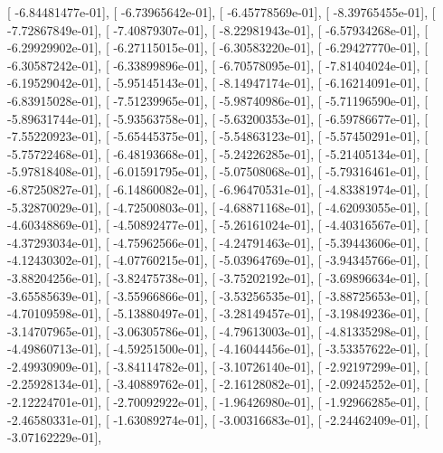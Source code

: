 \documentclass{article}
\begin{document}
       [ -6.84481477e-01],
       [ -6.73965642e-01],
       [ -6.45778569e-01],
       [ -8.39765455e-01],
       [ -7.72867849e-01],
       [ -7.40879307e-01],
       [ -8.22981943e-01],
       [ -6.57934268e-01],
       [ -6.29929902e-01],
       [ -6.27115015e-01],
       [ -6.30583220e-01],
       [ -6.29427770e-01],
       [ -6.30587242e-01],
       [ -6.33899896e-01],
       [ -6.70578095e-01],
       [ -7.81404024e-01],
       [ -6.19529042e-01],
       [ -5.95145143e-01],
       [ -8.14947174e-01],
       [ -6.16214091e-01],
       [ -6.83915028e-01],
       [ -7.51239965e-01],
       [ -5.98740986e-01],
       [ -5.71196590e-01],
       [ -5.89631744e-01],
       [ -5.93563758e-01],
       [ -5.63200353e-01],
       [ -6.59786677e-01],
       [ -7.55220923e-01],
       [ -5.65445375e-01],
       [ -5.54863123e-01],
       [ -5.57450291e-01],
       [ -5.75722468e-01],
       [ -6.48193668e-01],
       [ -5.24226285e-01],
       [ -5.21405134e-01],
       [ -5.97818408e-01],
       [ -6.01591795e-01],
       [ -5.07508068e-01],
       [ -5.79316461e-01],
       [ -6.87250827e-01],
       [ -6.14860082e-01],
       [ -6.96470531e-01],
       [ -4.83381974e-01],
       [ -5.32870029e-01],
       [ -4.72500803e-01],
       [ -4.68871168e-01],
       [ -4.62093055e-01],
       [ -4.60348869e-01],
       [ -4.50892477e-01],
       [ -5.26161024e-01],
       [ -4.40316567e-01],
       [ -4.37293034e-01],
       [ -4.75962566e-01],
       [ -4.24791463e-01],
       [ -5.39443606e-01],
       [ -4.12430302e-01],
       [ -4.07760215e-01],
       [ -5.03964769e-01],
       [ -3.94345766e-01],
       [ -3.88204256e-01],
       [ -3.82475738e-01],
       [ -3.75202192e-01],
       [ -3.69896634e-01],
       [ -3.65585639e-01],
       [ -3.55966866e-01],
       [ -3.53256535e-01],
       [ -3.88725653e-01],
       [ -4.70109598e-01],
       [ -5.13880497e-01],
       [ -3.28149457e-01],
       [ -3.19849236e-01],
       [ -3.14707965e-01],
       [ -3.06305786e-01],
       [ -4.79613003e-01],
       [ -4.81335298e-01],
       [ -4.49860713e-01],
       [ -4.59251500e-01],
       [ -4.16044456e-01],
       [ -3.53357622e-01],
       [ -2.49930909e-01],
       [ -3.84114782e-01],
       [ -3.10726140e-01],
       [ -2.92197299e-01],
       [ -2.25928134e-01],
       [ -3.40889762e-01],
       [ -2.16128082e-01],
       [ -2.09245252e-01],
       [ -2.12224701e-01],
       [ -2.70092922e-01],
       [ -1.96426980e-01],
       [ -1.92966285e-01],
       [ -2.46580331e-01],
       [ -1.63089274e-01],
       [ -3.00316683e-01],
       [ -2.24462409e-01],
       [ -3.07162229e-01],
\end{document}

